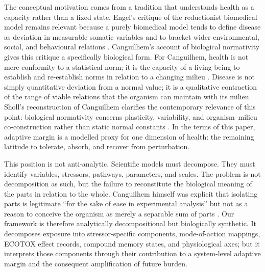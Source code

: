The conceptual motivation comes from a tradition that understands health as a capacity rather than a fixed state. Engel's critique of the reductionist biomedical model remains relevant because a purely biomedical model tends to define disease as deviation in measurable somatic variables and to bracket wider environmental, social, and behavioural relations \citep{engel1977newmodel}. Canguilhem's account of biological normativity gives this critique a specifically biological form. For Canguilhem, health is not mere conformity to a statistical norm; it is the capacity of a living being to establish and re-establish norms in relation to a changing milieu \citep{canguilhem1991normal,canguilhem2008knowledge}. Disease is not simply quantitative deviation from a normal value; it is a qualitative contraction of the range of viable relations that the organism can maintain with its milieu. Sholl's reconstruction of Canguilhem clarifies the contemporary relevance of this point: biological normativity concerns plasticity, variability, and organism--milieu co-construction rather than static normal constants \citep{sholl2020plastic}. In the terms of this paper, adaptive margin is a modelled proxy for one dimension of health: the remaining latitude to tolerate, absorb, and recover from perturbation.

This position is not anti-analytic. Scientific models must decompose. They must identify variables, stressors, pathways, parameters, and scales. The problem is not decomposition as such, but the failure to reconstitute the biological meaning of the parts in relation to the whole. Canguilhem himself was explicit that isolating parts is legitimate ``for the sake of ease in experimental analysis'' but not as a reason to conceive the organism as merely a separable sum of parts \citep{canguilhem2008knowledge}. Our framework is therefore analytically decompositional but biologically synthetic. It decomposes exposure into stressor-specific components, mode-of-action mappings, ECOTOX effect records, compound memory states, and physiological axes; but it interprets those components through their contribution to a system-level adaptive margin and the consequent amplification of future burden.

